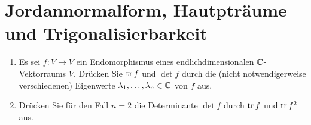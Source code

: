 \section{Jordannormalform, Hautpträume und Trigonalisierbarkeit}







\begin{question}[subtitle = Spur und Determinante durch Eigenwerte]{1}
  \begin{enumerate}[leftmargin=*]
    \item
      Es sei $f \colon V \to V$ ein Endomorphismus eines endlichdimensionalen $\mathbb{C}$-Vektorraums $V$.
      Drücken Sie $\operatorname{tr} f$ und $\det f$ durch die (nicht notwendigerweise verschiedenen) Eigenwerte $\lambda_1, \dotsc, \lambda_n \in \mathbb{C}$ von $f$ aus.
    \item
      Drücken Sie für den Fall $n = 2$ die Determinante $\det f$ durch $\operatorname{tr} f$ und $\operatorname{tr} f^2$ aus.
  \end{enumerate}
\end{question}


